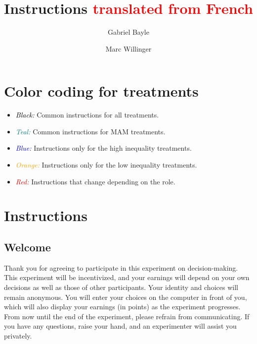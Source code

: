 \documentclass[12pt]{article}
\begin{document}
\title{Instructions \textcolor{red}{translated from French}}
\maketitle

\author[1,*]{Gabriel Bayle}
\author[1]{Marc Willinger}


 \section{Color coding for treatments}
 \begin{itemize}
     \item \textcolor{black}{\textit{Black:}} Common instructions for all treatments.
     \item \textcolor{teal}{\textit{Teal:}} Common instructions for MAM treatments.
     \item \textcolor{blue}{\textit{Blue:}} Instructions only for the high inequality treatments.
     \item \textcolor{orange}{\textit{Orange:}} Instructions only for the low inequality treatments.
     \item \textcolor{red}{\textit{Red:}} Instructions that change depending on the role.
 \end{itemize}
 \newpage

 \section{Instructions}

\subsection*{Welcome}

\noindent Thank you for agreeing to participate in this experiment on decision-making. This experiment will be incentivized, and your earnings will depend on your own decisions as well as those of other participants. Your identity and choices will remain anonymous. You will enter your choices on the computer in front of you, which will also display your earnings (in points) as the experiment progresses.\\

\noindent From now until the end of the experiment, please refrain from communicating. If you have any questions, raise your hand, and an experimenter will assist you privately.
\end{document}
